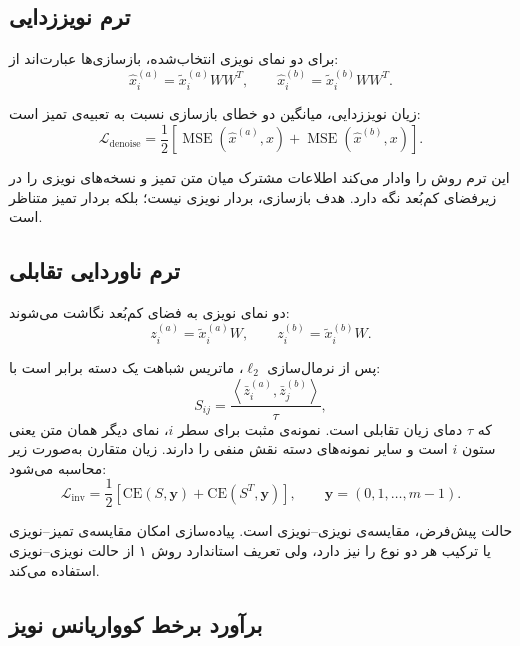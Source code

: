\documentclass[a4paper,12pt]{article}
\newcommand{\InfoNCE}{\lr{InfoNCE}}
\newcommand{\MSE}{\operatorname{MSE}}
\newcommand{\Dterm}{\lr{D}}
\newcommand{\Iterm}{\lr{I}}
\begin{document}
\subsection{ترم نویززدایی \Dterm{}}

برای دو نمای نویزی انتخاب‌شده، بازسازی‌ها عبارت‌اند از:
\begin{equation}
 \hat{x}_i^{(a)}=\tilde{x}_i^{(a)}WW^{T},
 \qquad
 \hat{x}_i^{(b)}=\tilde{x}_i^{(b)}WW^{T}.
\end{equation}

زیان نویززدایی، میانگین دو خطای بازسازی نسبت به تعبیه‌ی تمیز است:
\begin{equation}
 \mathcal{L}_{\mathrm{denoise}}
 =
 \frac{1}{2}
 \left[
 \MSE\!\left(\hat{x}^{(a)},x\right)
 +
 \MSE\!\left(\hat{x}^{(b)},x\right)
 \right].
\end{equation}

این ترم روش را وادار می‌کند اطلاعات مشترک میان متن تمیز و نسخه‌های نویزی را در زیرفضای کم‌بُعد نگه دارد. هدف بازسازی، بردار نویزی نیست؛ بلکه بردار تمیز متناظر است.

\subsection{ترم ناوردایی تقابلی \Iterm{}}

دو نمای نویزی به فضای کم‌بُعد نگاشت می‌شوند:
\begin{equation}
 z_i^{(a)}=\tilde{x}_i^{(a)}W,
 \qquad
 z_i^{(b)}=\tilde{x}_i^{(b)}W.
\end{equation}

پس از نرمال‌سازی $\ell_2$، ماتریس شباهت یک دسته برابر است با:
\begin{equation}
 S_{ij}
 =
 \frac{
 \left\langle
 \bar{z}_i^{(a)},
 \bar{z}_j^{(b)}
 \right\rangle
 }{\tau},
\end{equation}
که $\tau$ دمای زیان تقابلی است. نمونه‌ی مثبت برای سطر $i$، نمای دیگر همان متن یعنی ستون $i$ است و سایر نمونه‌های دسته نقش منفی را دارند. زیان متقارن \InfoNCE{} به‌صورت زیر محاسبه می‌شود:
\begin{equation}
 \mathcal{L}_{\mathrm{inv}}
 =
 \frac{1}{2}
 \left[
 \mathrm{CE}(S,\mathbf{y})
 +
 \mathrm{CE}(S^{T},\mathbf{y})
 \right],
 \qquad
 \mathbf{y}=(0,1,\ldots,m-1).
\end{equation}

حالت پیش‌فرض، مقایسه‌ی نویزی--نویزی است. پیاده‌سازی امکان مقایسه‌ی تمیز--نویزی یا ترکیب هر دو نوع را نیز دارد، ولی تعریف استاندارد روش ۱ از حالت نویزی--نویزی استفاده می‌کند.

\subsection{برآورد برخط کوواریانس نویز}
\end{document}
